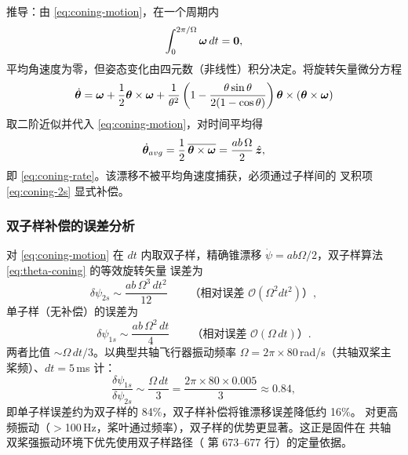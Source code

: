 推导：由 \cref{eq:coning-motion}，在一个周期内
\begin{equation}
  \int_0^{2\pi/\Omega} \boldsymbol{\omega}\,dt = \boldsymbol{0},
  \label{eq:coning-zero-mean}
\end{equation}
平均角速度为零，但姿态变化由四元数（非线性）积分决定。将旋转矢量微分方程
\begin{equation}
  \dot{\boldsymbol{\theta}} = \boldsymbol{\omega}
    + \frac{1}{2}\boldsymbol{\theta}\times\boldsymbol{\omega}
    + \frac{1}{\theta^2}\left(1 - \frac{\theta\sin\theta}{2(1-\cos\theta)}\right)
      \boldsymbol{\theta}\times(\boldsymbol{\theta}\times\boldsymbol{\omega})
  \label{eq:rotation-vector-dyn}
\end{equation}
取二阶近似并代入 \cref{eq:coning-motion}，对时间平均得
\begin{equation}
  \dot{\boldsymbol{\theta}}_{avg} = \frac{1}{2}\,
  \overline{\boldsymbol{\theta}\times\boldsymbol{\omega}} = \frac{ab\,\Omega}{2}\,\hat{\boldsymbol{z}},
  \label{eq:coning-drift-derivation}
\end{equation}
即 \cref{eq:coning-rate}。该漂移不被平均角速度捕获，必须通过子样间的
叉积项 \cref{eq:coning-2s} 显式补偿。

\subsubsection{双子样补偿的误差分析}

对 \cref{eq:coning-motion} 在 $dt$ 内取双子样，精确锥漂移
$\dot{\psi} = ab\Omega/2$，双子样算法 \cref{eq:theta-coning} 的等效旋转矢量
误差为
\begin{equation}
  \delta\psi_{2s} \sim \frac{ab\,\Omega^3\,dt^2}{12}
  \qquad\text{（相对误差 } \mathcal{O}(\Omega^2 dt^2)\text{）},
  \label{eq:coning-2s-error}
\end{equation}
单子样（无补偿）的误差为
\begin{equation}
  \delta\psi_{1s} \sim \frac{ab\,\Omega^2\,dt}{4}
  \qquad\text{（相对误差 } \mathcal{O}(\Omega\,dt)\text{）}.
  \label{eq:coning-1s-error}
\end{equation}
两者比值 $\sim \Omega\,dt/3$。以典型共轴飞行器振动频率 $\Omega = 2\pi\times
80$\,rad/s（共轴双桨主桨频）、$dt = 5$\,ms 计：
\begin{equation}
  \frac{\delta\psi_{1s}}{\delta\psi_{2s}} \sim \frac{\Omega\,dt}{3}
  = \frac{2\pi\times80\times0.005}{3} \approx 0.84,
  \label{eq:coning-ratio-num}
\end{equation}
即单子样误差约为双子样的 84\%，双子样补偿将锥漂移误差降低约 16\%。
对更高频振动（$>$100\,Hz，桨叶通过频率），双子样的优势更显著。这正是固件在
共轴双桨强振动环境下优先使用双子样路径（ 第
673--677 行）的定量依据。

